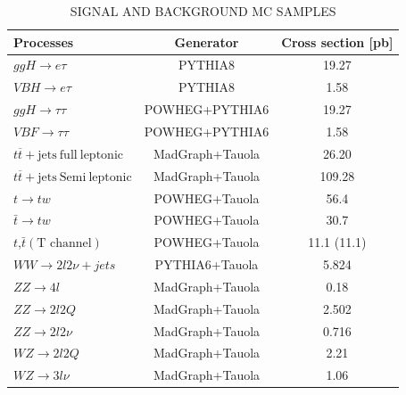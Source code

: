 \begin{table}[hbtp]
 \begin{center}
  \caption{SIGNAL AND BACKGROUND MC SAMPLES}
  \label{tab:mcdatasets}
  \begin{tabular}{|l|c|c|} \hline 
Processes & Generator & Cross section [pb] \\\hline
$ggH\to e\tau $     &          PYTHIA8                     &  19.27                \\\hline
$VBH\to e\tau$     &          PYTHIA8                      &   1.58                \\  \hline
$ggH \to \tau\tau$ &POWHEG+PYTHIA6              &  19.27           \\\hline
 $VBF\to\tau\tau$  &POWHEG+PYTHIA6              &   1.58           \\  \hline
$t\overline{t}+\textrm{jets}~ \textrm{full}~\textrm{leptonic}$  &  MadGraph+Tauola                &  26.20                \\\hline
$t\overline{t}+\textrm{jets}~\textrm{Semi}~\textrm{leptonic}$   & MadGraph+Tauola           &  109.28               \\ \hline
$t \to tw$              &   POWHEG+Tauola     &    56.4 \\\hline
$\bar{t} \to tw$              &   POWHEG+Tauola     &    30.7 \\\hline
$t$,$\bar{t}(\textrm{T channel})$           & POWHEG+Tauola        &   11.1 (11.1)          \\ \hline
$WW \to 2l2\nu+jets$    & PYTHIA6+Tauola                  & 5.824\\ \hline
$ZZ\to 4l$               & MadGraph+Tauola                 & 0.18                  \\  \hline
$ZZ\to 2l2Q$             &MadGraph+Tauola              &   2.502               \\  \hline
$ZZ\to 2l2\nu$           &MadGraph+Tauola              &    0.716              \\  \hline
$WZ\to 2l2Q$             &MadGraph+Tauola                &    2.21               \\  \hline
$WZ\to 3l\nu$            &MadGraph+Tauola           & 1.06                  \\  \hline
  \end{tabular}
 \end{center}
\end{table}





